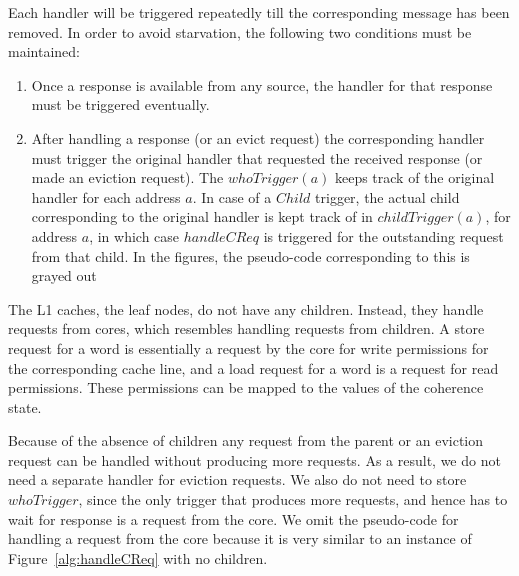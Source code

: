Each handler will be triggered repeatedly till the corresponding message has
been removed. In order to avoid starvation, the following two conditions must be
maintained:

\begin{enumerate}

\item Once a response is available from any source, the handler for that
response must be triggered eventually.

\item After handling a response (or an evict request) the corresponding handler
must trigger the original handler that requested the received response (or made
an eviction request). The $whoTrigger(a)$ keeps track of the original handler
for each address $a$. In case of a $Child$ trigger, the actual child
corresponding to the original handler is kept track of in $childTrigger(a)$, for
address $a$, in which case $handleCReq$ is triggered for the outstanding request
from that child. In the figures, the pseudo-code corresponding to this is grayed out

\end{enumerate}

The L1 caches, \ie the leaf nodes, do not have any children. Instead, they
handle requests from cores, which resembles handling requests from children. A
store request for a word is essentially a request by the core for write
permissions for the corresponding cache line, and a load request for a word is a
request for read permissions. These permissions can be mapped to the values of
the coherence state.

Because of the absence of children any request from the parent or an eviction
request can be handled without producing more requests. As a result, we do not
need a separate handler for eviction requests. We also do not need to store
$whoTrigger$, since the only trigger that produces more requests, and hence has
to wait for response is a request from the core. We omit the pseudo-code for
handling a request from the core because it is very similar to an instance of
Figure~\ref{alg:handleCReq} with no children.


